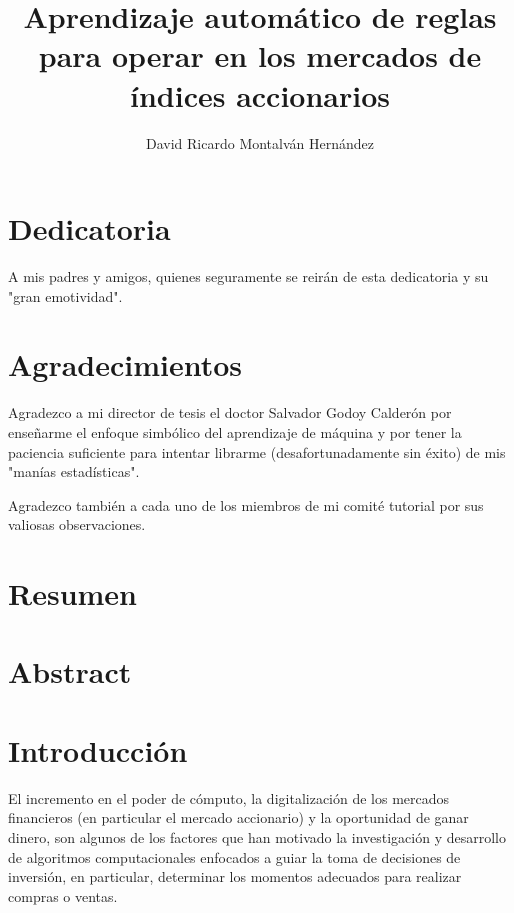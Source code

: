 \documentclass[12pt]{scrbook}
\title{Aprendizaje automático de reglas para operar en los mercados de índices accionarios}
\date{}
\author{David Ricardo Montalván Hernández}
\theoremstyle{break}
\theoremstyle{break}
\begin{document}
\maketitle
{} %
\renewcommand{\contentsname}{Contenido}
\tableofcontents
\renewcommand{\listfigurename}{Lista de imágenes}
\listoffigures
\renewcommand{\listtablename}{Lista de tablas}
\renewcommand\tablename{Tabla}
\renewcommand{\bibname}{Referencias}
\renewcommand{\figurename}{Imagen}
\listoftables

\chapter*{Dedicatoria}
A mis padres y amigos, quienes seguramente se reirán de esta dedicatoria y su "gran emotividad".

\chapter*{Agradecimientos}
Agradezco a mi director de tesis el doctor Salvador Godoy Calderón por enseñarme el enfoque simbólico del aprendizaje de máquina y por tener la paciencia suficiente para  intentar librarme (desafortunadamente sin éxito) de mis "manías estadísticas".

Agradezco también a cada uno de los miembros de mi comité tutorial por sus valiosas observaciones.

\chapter*{Resumen}
\chapter*{Abstract}


\chapter{Introducción}
\label{capitulo:introduccion}
El incremento en el poder de cómputo, la digitalización de los mercados financieros (en particular el mercado accionario) y la oportunidad de ganar dinero, son algunos de los factores que han motivado la investigación y desarrollo de algoritmos computacionales enfocados a guiar la toma de decisiones de inversión, en particular, determinar los momentos adecuados para realizar compras o ventas.
\end{document}
